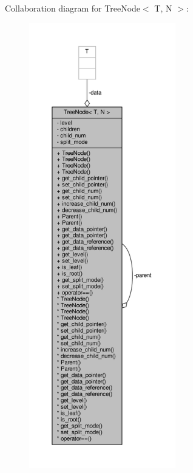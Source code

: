 Collaboration diagram for Tree\+Node$<$ T, N $>$\+:\nopagebreak
\begin{figure}[H]
\begin{center}
\leavevmode
\includegraphics[height=550pt]{classTreeNode__coll__graph}
\end{center}
\end{figure}
